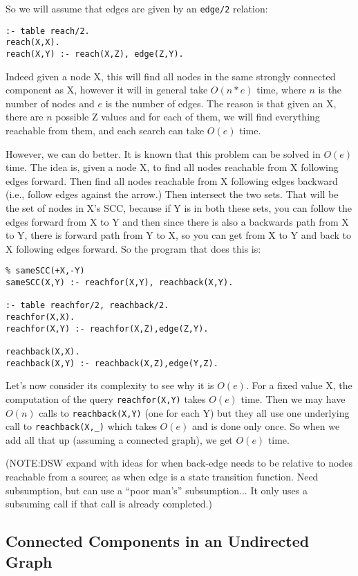 So we will assume that edges are given by an \verb|edge/2|
relation:
\begin{verbatim}
:- table reach/2.
reach(X,X).
reach(X,Y) :- reach(X,Z), edge(Z,Y).
\end{verbatim}

Indeed given a node X, this will find all nodes in the same strongly
connected component as X, however it will in general take $O(n*e)$
time, where $n$ is the number of nodes and $e$ is the number of edges.
The reason is that given an X, there are $n$ possible Z values and for
each of them, we will find everything reachable from them, and each
search can take $O(e)$ time.

However, we can do better.  It is known that this problem can be
solved in $O(e)$ time.  The idea is, given a node X, to find all nodes
reachable from X following edges forward.  Then find all nodes
reachable from X following edges backward (i.e., follow edges against
the arrow.)  Then intersect the two sets.  That will be the set of
nodes in X's SCC, because if Y is in both these sets, you can follow
the edges forward from X to Y and then since there is also a backwards
path from X to Y, there is forward path from Y to X, so you can get
from X to Y and back to X following edges forward.  So the program
that does this is:

\begin{verbatim}
% sameSCC(+X,-Y)
sameSCC(X,Y) :- reachfor(X,Y), reachback(X,Y).

:- table reachfor/2, reachback/2.
reachfor(X,X).
reachfor(X,Y) :- reachfor(X,Z),edge(Z,Y).

reachback(X,X).
reachback(X,Y) :- reachback(X,Z),edge(Y,Z).
\end{verbatim}

Let's now consider its complexity to see why it is $O(e)$.  For a
fixed value X, the computation of the query \verb|reachfor(X,Y)| takes
$O(e)$ time.  Then we may have $O(n)$ calls to \verb|reachback(X,Y)|
(one for each Y) but they all use one underlying call to
\verb|reachback(X,_)| which takes $O(e)$ and is done only once.  So
when we add all that up (assuming a connected graph), we get $O(e)$
time.

(NOTE:DSW expand with ideas for when back-edge needs to be relative to 
nodes reachable from a source; as when edge is a state transition
function.  Need subsumption, but can use a ``poor man's'' subsumption...
It only uses a subsuming call if that call is already completed.)


\subsection{Connected Components in an Undirected Graph}

